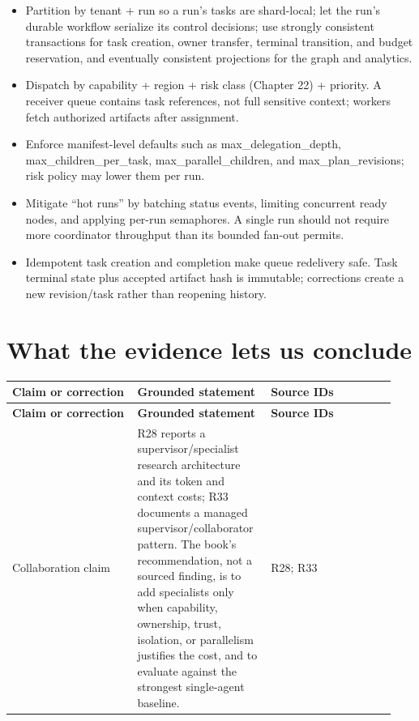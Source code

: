 \begin{itemize}

\item Partition by tenant + run so a run's tasks are shard-local; let the run's durable workflow serialize its control decisions; use strongly consistent transactions for task creation, owner transfer, terminal transition, and budget reservation, and eventually consistent projections for the graph and analytics.

\item Dispatch by capability + region + risk class (Chapter 22) + priority. A receiver queue contains task references, not full sensitive context; workers fetch authorized artifacts after assignment.

\item Enforce manifest-level defaults such as max\_delegation\_depth, max\_children\_per\_task, max\_parallel\_children, and max\_plan\_revisions; risk policy may lower them per run.

\item Mitigate “hot runs” by batching status events, limiting concurrent ready nodes, and applying per-run semaphores. A single run should not require more coordinator throughput than its bounded fan-out permits.

\item Idempotent task creation and completion make queue redelivery safe. Task terminal state plus accepted artifact hash is immutable; corrections create a new revision/task rather than reopening history.

\end{itemize}

\section{What the evidence lets us conclude}

\BookTableStart
\small
\begin{longtable}{@{}Y{0.3133\linewidth}Y{0.3133\linewidth}Y{0.3133\linewidth}@{}}
\color{white}\bfseries \textbf{Claim or correction} & \color{white}\bfseries \textbf{Grounded statement} & \color{white}\bfseries \textbf{Source IDs} \\
\endfirsthead
{}
\color{white}\bfseries \textbf{Claim or correction} & \color{white}\bfseries \textbf{Grounded statement} & \color{white}\bfseries \textbf{Source IDs} \\
\endhead
Collaboration claim & R28 reports a supervisor/specialist research architecture and its token and context costs; R33 documents a managed supervisor/collaborator pattern. The book's recommendation, not a sourced finding, is to add specialists only when capability, ownership, trust, isolation, or parallelism justifies the cost, and to evaluate against the strongest single-agent baseline. & R28; R33 \\
\end{longtable}
\BookTableEnd

